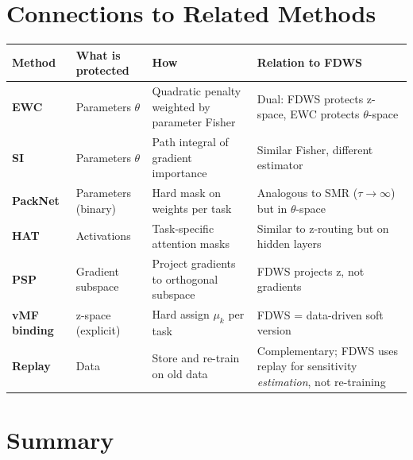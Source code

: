 \documentclass[11pt]{article}
\begin{document}
\section{Connections to Related Methods}

\begin{center}
\begin{tabular}{lp{3.5cm}p{3.5cm}p{4cm}}
\toprule
\textbf{Method} & \textbf{What is protected} & \textbf{How} & \textbf{Relation to FDWS} \\
\midrule
\textbf{EWC} & Parameters $\theta$ & Quadratic penalty weighted by parameter Fisher & Dual: FDWS protects z-space, EWC protects $\theta$-space \\
\textbf{SI} & Parameters $\theta$ & Path integral of gradient importance & Similar Fisher, different estimator \\
\textbf{PackNet} & Parameters (binary) & Hard mask on weights per task & Analogous to SMR ($\tau \to \infty$) but in $\theta$-space \\
\textbf{HAT} & Activations & Task-specific attention masks & Similar to z-routing but on hidden layers \\
\textbf{PSP} & Gradient subspace & Project gradients to orthogonal subspace & FDWS projects z, not gradients \\
\textbf{vMF binding} & z-space (explicit) & Hard assign $\mu_k$ per task & FDWS = data-driven soft version \\
\textbf{Replay} & Data & Store and re-train on old data & Complementary; FDWS uses replay for sensitivity \emph{estimation}, not re-training \\
\bottomrule
\end{tabular}
\end{center}

\section{Summary}
\end{document}
